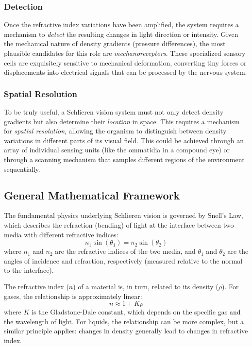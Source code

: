 \documentclass[11pt]{article}
\begin{document}
\subsubsection{Detection}
Once the refractive index variations have been amplified, the system requires a mechanism to \textit{detect} the resulting changes in light direction or intensity. Given the mechanical nature of density gradients (pressure differences), the most plausible candidates for this role are \textit{mechanoreceptors}. These specialized sensory cells are exquisitely sensitive to mechanical deformation, converting tiny forces or displacements into electrical signals that can be processed by the nervous system.

\subsubsection{Spatial Resolution}
To be truly useful, a Schlieren vision system must not only detect density gradients but also determine their \textit{location} in space. This requires a mechanism for \textit{spatial resolution}, allowing the organism to distinguish between density variations in different parts of its visual field. This could be achieved through an array of individual sensing units (like the ommatidia in a compound eye) or through a scanning mechanism that samples different regions of the environment sequentially.

\subsection{General Mathematical Framework}

The fundamental physics underlying Schlieren vision is governed by Snell's Law, which describes the refraction (bending) of light at the interface between two media with different refractive indices:
\[n_1\sin(\theta_1) = n_2\sin(\theta_2)\]
where $n_1$ and $n_2$ are the refractive indices of the two media, and $\theta_1$ and $\theta_2$ are the angles of incidence and refraction, respectively (measured relative to the normal to the interface).

The refractive index ($n$) of a material is, in turn, related to its density ($\rho$). For gases, the relationship is approximately linear:
\[n \approx 1 + K\rho\]
where $K$ is the Gladstone-Dale constant, which depends on the specific gas and the wavelength of light. For liquids, the relationship can be more complex, but a similar principle applies: changes in density generally lead to changes in refractive index.
\end{document}

